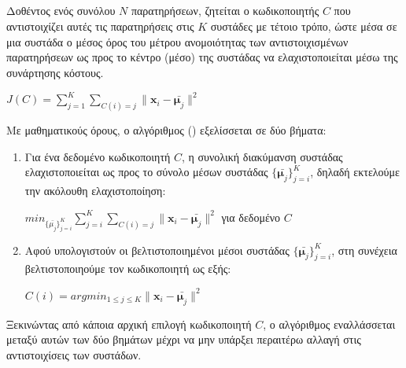 \subsection{}
\label{doc:kmeans}
Δοθέντος ενός συνόλου $N$ παρατηρήσεων, ζητείται ο κωδικοποιητής $C$ που αντιστοιχίζει αυτές τις παρατηρήσεις στις $K$ συστάδες με τέτοιο τρόπο, ώστε μέσα σε μια συστάδα ο μέσος όρος του μέτρου ανομοιότητας των αντιστοιχισμένων παρατηρήσεων ως προς το κέντρο (μέσο) της συστάδας να ελαχιστοποιείται μέσω της συνάρτησης κόστους.
\begin{center}
$J(C)= \sum_{j=1}^K \sum_{C(i)=j}\|\mathbf{x}_i-\bar{\mathbf{\mu}_j}\|^2$
\end{center}
Με μαθηματικούς όρους, ο αλγόριθμος () εξελίσσεται σε δύο βήματα:
\begin{enumerate}
\item Για ένα δεδομένο κωδικοποιητή $C$, η συνολική διακύμανση συστάδας ελαχιστοποιείται ως προς το σύνολο μέσων συστάδας $\{\bar{\mathbf{\mu}_j}\}_{j=i}^K$, δηλαδή εκτελούμε την ακόλουθη ελαχιστοποίηση:
\begin{center}
$ min_{\{\bar{\mu_j}\}_{j=i}^K} \sum_{j=i}^K \sum_{C(i)=j} \|\mathbf{x}_i-\bar{\mathbf{\mu}_j}\|^2$ για δεδομένο $C$
\end{center}
\item Αφού υπολογιστούν οι βελτιστοποιημένοι μέσοι συστάδας $\{\bar{\mathbf{\mu}_j}\}_{j=i}^K$, στη συνέχεια βελτιστοποιηούμε τον κωδικοποιητή ως εξής:
\begin{center}
$C(i) = arg min_{1 \leq j \leq K} \|\mathbf{x}_i-\bar{\mathbf{\mu}_j}\|^2$
\end{center}
\end{enumerate}
\par Ξεκινώντας από κάποια αρχική επιλογή κωδικοποιητή $C$, ο αλγόριθμος εναλλάσσεται μεταξύ αυτών των δύο βημάτων μέχρι να μην υπάρξει περαιτέρω αλλαγή στις αντιστοιχίσεις των συστάδων\cite{haykin}.
